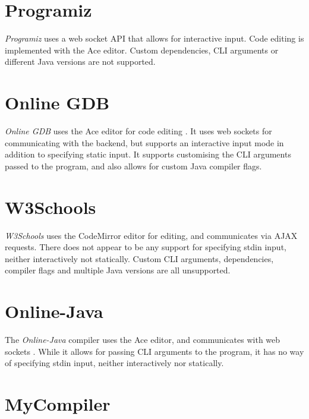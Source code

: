 
\section{Programiz}

\emph{Programiz} \cite{programiz-2022} uses a web socket API that allows for interactive input. Code editing is implemented with the Ace editor. Custom dependencies, CLI arguments or different Java versions are not supported.


\section{Online GDB}

\emph{Online GDB} uses the Ace editor for code editing \cite{gdb-online-2022}. It uses web sockets for communicating with the backend, but supports an interactive input mode in addition to specifying static input. It supports customising the CLI arguments passed to the program, and also allows for custom Java compiler flags.


\section{W3Schools}

\emph{W3Schools} \cite{w3schools-2022} uses the CodeMirror editor for editing, and communicates via AJAX requests. There does not appear to be any support for specifying stdin input, neither interactively not statically. Custom CLI arguments, dependencies, compiler flags and multiple Java versions are all unsupported.


\section{Online-Java}

The \emph{Online-Java} compiler uses the Ace editor, and communicates with web sockets \cite{online-ide-2022}. While it allows for passing CLI arguments to the program, it has no way of specifying stdin input, neither interactively nor statically.


\section{MyCompiler}

